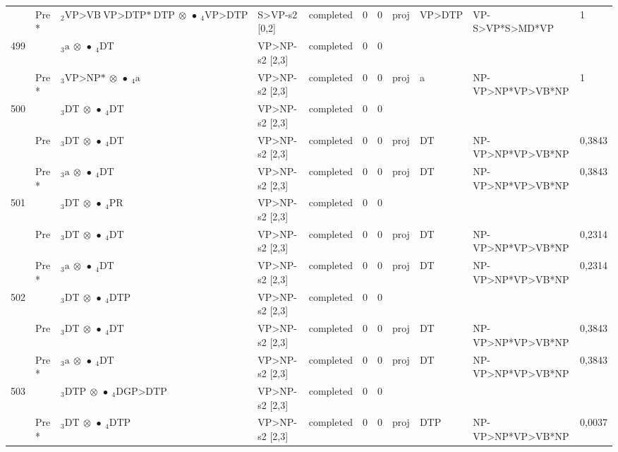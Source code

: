 \documentclass[10pt]{article}
\begin{document}
\begin{longtable}[htbp]{lllllllllll}
 & Pre *& $ {}_2 \textrm{VP>VB} \ \textrm{VP>DTP*} \ \textrm{DTP} \  \otimes \  \bullet \ {}_{4} \textrm{VP>DTP} $ & S>VP-s2 [0,2] & completed & 0 & 0 & proj & VP>DTP & VP-S>VP*S>MD*VP & 1 \\ 
499 & & $ {}_3 \textrm{a} \  \otimes \  \bullet \ {}_{4} \textrm{DT} $ & VP>NP-s2 [2,3] & completed & 0 & 0 & & & & \\ 
 & Pre *& $ {}_3 \textrm{VP>NP*} \  \otimes \  \bullet \ {}_{4} \textrm{a} $ & VP>NP-s2 [2,3] & completed & 0 & 0 & proj & a & NP-VP>NP*VP>VB*NP & 1 \\ 
500 & & $ {}_3 \textrm{DT} \  \otimes \  \bullet \ {}_{4} \textrm{DT} $ & VP>NP-s2 [2,3] & completed & 0 & 0 & & & & \\ 
 & Pre & $ {}_3 \textrm{DT} \  \otimes \  \bullet \ {}_{4} \textrm{DT} $ & VP>NP-s2 [2,3] & completed & 0 & 0 & proj & DT & NP-VP>NP*VP>VB*NP & 0,3843 \\ 
 & Pre *& $ {}_3 \textrm{a} \  \otimes \  \bullet \ {}_{4} \textrm{DT} $ & VP>NP-s2 [2,3] & completed & 0 & 0 & proj & DT & NP-VP>NP*VP>VB*NP & 0,3843 \\ 
501 & & $ {}_3 \textrm{DT} \  \otimes \  \bullet \ {}_{4} \textrm{PR} $ & VP>NP-s2 [2,3] & completed & 0 & 0 & & & & \\ 
 & Pre & $ {}_3 \textrm{DT} \  \otimes \  \bullet \ {}_{4} \textrm{DT} $ & VP>NP-s2 [2,3] & completed & 0 & 0 & proj & DT & NP-VP>NP*VP>VB*NP & 0,2314 \\ 
 & Pre *& $ {}_3 \textrm{a} \  \otimes \  \bullet \ {}_{4} \textrm{DT} $ & VP>NP-s2 [2,3] & completed & 0 & 0 & proj & DT & NP-VP>NP*VP>VB*NP & 0,2314 \\ 
502 & & $ {}_3 \textrm{DT} \  \otimes \  \bullet \ {}_{4} \textrm{DTP} $ & VP>NP-s2 [2,3] & completed & 0 & 0 & & & & \\ 
 & Pre & $ {}_3 \textrm{DT} \  \otimes \  \bullet \ {}_{4} \textrm{DT} $ & VP>NP-s2 [2,3] & completed & 0 & 0 & proj & DT & NP-VP>NP*VP>VB*NP & 0,3843 \\ 
 & Pre *& $ {}_3 \textrm{a} \  \otimes \  \bullet \ {}_{4} \textrm{DT} $ & VP>NP-s2 [2,3] & completed & 0 & 0 & proj & DT & NP-VP>NP*VP>VB*NP & 0,3843 \\ 
503 & & $ {}_3 \textrm{DTP} \  \otimes \  \bullet \ {}_{4} \textrm{DGP>DTP} $ & VP>NP-s2 [2,3] & completed & 0 & 0 & & & & \\ 
 & Pre *& $ {}_3 \textrm{DT} \  \otimes \  \bullet \ {}_{4} \textrm{DTP} $ & VP>NP-s2 [2,3] & completed & 0 & 0 & proj & DTP & NP-VP>NP*VP>VB*NP & 0,0037 \\ 

\end{longtable}
\end{document}
